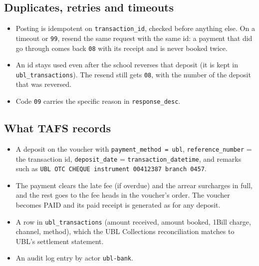 \documentclass[11pt]{article}
\begin{document}
\subsection{Duplicates, retries and timeouts}\label{sec:retries}
\begin{itemize}[nosep]
  \item Posting is idempotent on \texttt{transaction\_id}, checked before anything else. On a timeout or \texttt{99},
        resend the same request with the same id: a payment that did go through comes back \texttt{08} with its receipt
        and is never booked twice.
  \item An id stays used even after the school reverses that deposit (it is kept in \texttt{ubl\_transactions}). The
        resend still gets \texttt{08}, with the number of the deposit that was reversed.
  \item Code \texttt{09} carries the specific reason in \texttt{response\_desc}.
\end{itemize}

\subsection{What TAFS records}
\begin{itemize}[nosep]
  \item A deposit on the voucher with \texttt{payment\_method = ubl}, \texttt{reference\_number} = the transaction id,
        \texttt{deposit\_date} = \texttt{transaction\_datetime}, and remarks such as
        \texttt{UBL OTC \textperiodcentered{} CHEQUE \textperiodcentered{} instrument 00412387 \textperiodcentered{} branch 0457}.
  \item The payment clears the late fee (if overdue) and the arrear surcharges in full, and the rest goes to the fee
        heads in the voucher's order. The voucher becomes PAID and its paid receipt is generated as for any deposit.
  \item A row in \texttt{ubl\_transactions} (amount received, amount booked, 1Bill charge, channel, method), which the
        UBL Collections reconciliation matches to UBL's settlement statement.
  \item An audit log entry by actor \texttt{ubl-bank}.
\end{itemize}

\end{document}
